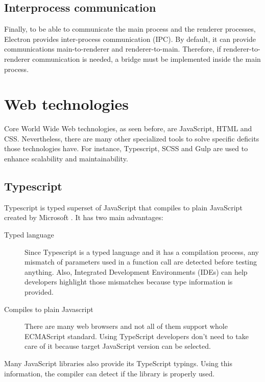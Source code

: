 \subsection{Interprocess communication}

Finally, to be able to communicate the main process and the renderer processes, 
Electron provides inter-process communication (IPC). By default, it can provide
communications main-to-renderer and renderer-to-main. Therefore, if renderer-to-renderer 
communication is needed, a bridge must be implemented inside the main process.


\section{Web technologies}

Core World Wide Web technologies, as seen before, are JavaScript, HTML and CSS.
Nevertheless, there are many other specialized tools to solve specific deficits 
those technologies have. For instance, Typescript, SCSS and Gulp are used to
enhance scalability and maintainability. 

\subsection{Typescript}

Typescript is typed superset of JavaScript that compiles to plain JavaScript
created by Microsoft \cite{typescript-web}. It has two main advantages:

\begin{description}
	\item[Typed language]
	Since Typescript is a typed language and it has a compilation process, any
	mismatch of parameters used in a function call are detected before testing
	anything. Also, Integrated Development Environments (IDEs) can help
	developers highlight those mismatches because type information is provided.
	
	\item[Compiles to plain Javascript]
	There are many web browsers and not all of them support whole ECMAScript 
	standard. Using TypeScript developers don't need to take care of it because
	target JavaScript version can be selected.

\end{description}

Many JavaScript libraries also provide its TypeScript typings. Using this 
information, the compiler can detect if the library is properly used.


